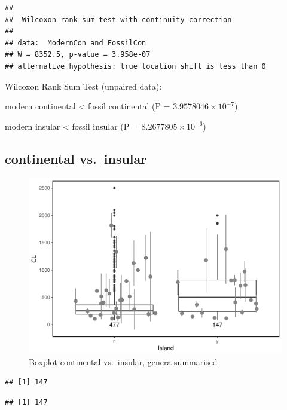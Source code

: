 \documentclass[]{article}
\begin{document}
\begin{verbatim}
## 
##  Wilcoxon rank sum test with continuity correction
## 
## data:  ModernCon and FossilCon
## W = 8352.5, p-value = 3.958e-07
## alternative hypothesis: true location shift is less than 0
\end{verbatim}

Wilcoxon Rank Sum Test (unpaired data):

modern continental \textless{} fossil continental (P =
\(3.9578046\times 10^{-7}\))

modern insular \textless{} fossil insular (P =
\(8.2677805\times 10^{-6}\))

\newpage

\subsection{continental vs.~insular}\label{continental-vs.insular-1}

\begin{figure}[htbp]
\centering
\includegraphics{MA_JJ_files/figure-latex/BPCI-1.pdf}
\caption{Boxplot continental vs.~insular, genera summarised}
\end{figure}

\begin{verbatim}
## [1] 147
\end{verbatim}

\begin{verbatim}
## [1] 147
\end{verbatim}
\end{document}
